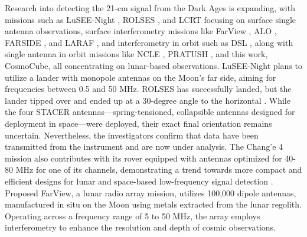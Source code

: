 \documentclass[fleqn,usenatbib]{rasti}
\begin{document}
Research into detecting the 21-cm signal from the Dark Ages is expanding, with missions such as LuSEE-Night \citep{bale2023}, ROLSES \citep{burns2021}, and LCRT \citep{goel2022probing} focusing on surface single antenna observations, surface interferometry missions like FarView \citep{Polidan2024}, ALO \citep{Wolt2024}, FARSIDE \citep{burns2021lunar}, and LARAF \citep{chen2024LARAF}, and interferometry in orbit such as DSL \citep{Chen2021}, along with single antenna in orbit missions like NCLE \citep{BENTUM2020856}, PRATUSH \citep{pratush2024}, and this work, CosmoCube, all concentrating on lunar-based observations. LuSEE-Night plans to utilize a lander with monopole antennas on the Moon's far side, aiming for frequencies between 0.5 and 50 MHz. ROLSES has successfully landed, but the lander tipped over and ended up at a 30-degree angle to the horizontal \citep{nasaROLSES}. While the four STACER antennas—spring-tensioned, collapsible antennas designed for deployment in space—were deployed, their exact final orientation remains uncertain. Nevertheless, the investigators confirm that data have been transmitted from the instrument and are now under analysis. The Chang’e 4 mission \citep{jia2018} also contributes with its rover equipped with antennas optimized for 40-80 MHz for one of its channels, demonstrating a trend towards more compact and efficient designs for lunar and space-based low-frequency signal detection \citep{lai2020}. Proposed FarView, a lunar radio array mission, utilizes 100,000 dipole antennas, manufactured in situ on the Moon using metals extracted from the lunar regolith. Operating across a frequency range of 5 to 50 MHz, the array employs interferometry to enhance the resolution and depth of cosmic observations.
\end{document}
